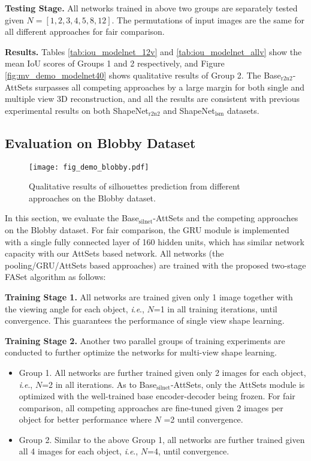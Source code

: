 \documentclass[twocolumn]{svjour3}    \pdfoutput=1
\newcommand{\nickname}{AttSets}
\newcommand{\faset}{FASet}
\newcommand{\ie}{\textit{i}.\textit{e}., }
\newcommand{\rev}{}
\begin{document}
\textbf{Testing Stage.} All networks trained in above two groups are separately tested given $N=[1,2,3,4,5,8,12]$. The permutations of input images are the same for all different approaches for fair comparison.

\textbf{Results.} Tables \ref{tab:iou_modelnet_12v} and \ref{tab:iou_modelnet_allv} show the mean IoU scores of Groups 1 and 2 respectively, and Figure \ref{fig:mv_demo_modelnet40} shows qualitative results of Group 2. The Base$_{\textrm{r2n2}}$-AttSets surpasses all competing approaches by a large margin for both single and multiple view 3D reconstruction, and all the results are consistent with previous experimental results on both ShapeNet$_{\textrm{r2n2}}$ and ShapeNet$_{\textrm{lsm}}$ datasets. 

\vspace{-0.45cm}
\subsection{Evaluation on Blobby Dataset}\label{sec:eval_blobby}
\begin{figure*}[t]
\centering
   \texttt{[image: fig\_demo\_blobby.pdf]}
\caption{Qualitative results of silhouettes prediction from different approaches on the Blobby dataset.}
\label{fig:mv_demo_blobby}
\vspace{-0.1cm}
\end{figure*}
In this section, we evaluate the Base$_{\textrm{silnet}}$-AttSets and the competing approaches on the Blobby dataset. For fair comparison, the GRU module is implemented with a single fully connected layer of 160 hidden units, which has similar network capacity with our \nickname{} based network. All networks \rev{(the pooling/GRU/\nickname{} based approaches)} are trained with the proposed two-stage \faset{} algorithm as follows:

\textbf{Training Stage 1.} All networks are trained given only 1 image together with the viewing angle for each object, \ie $N$=1 in all training iterations, until convergence. This guarantees the performance of single view shape learning. 

\textbf{Training Stage 2.} Another two parallel groups of training experiments are conducted to further optimize the networks for multi-view shape learning.
\vspace{-0.2cm}
\begin{itemize}[leftmargin=0.2cm]
\item Group 1. All networks are further trained given only 2 images for each object, \ie $N$=2 in all iterations. As to Base$_{\textrm{silnet}}$-AttSets, only the \nickname{} module is optimized with the well-trained base encoder-decoder being frozen. For fair comparison, all competing approaches are fine-tuned given 2 images per object for better performance where $N$ =2 until convergence.
\item Group 2. Similar to the above Group 1, all networks are further trained given all 4 images for each object, \ie $N$=4, until convergence.
\end{itemize}
\end{document}
